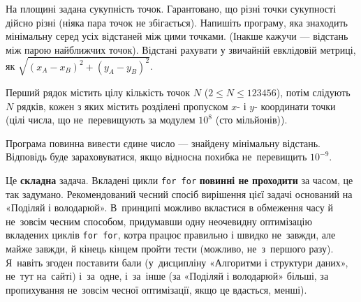 ﻿На площині задана сукупність точок. Гарантовано, що різні точки сукупності дійсно різні (ніяка пара точок не збігається). Напишіть програму, яка знаходить мінімальну серед усіх відстаней між цими точками. (Інакше кажучи --- відстань між парою найближчих точок). Відстані рахувати у звичайній евклідовій метриці, як $\sqrt{(x_A-x_B)^2+(y_A-y_B)^2}$.

\InputFile
Перший рядок містить цілу кількість точок $N$ ($2\leqslant N\leqslant 123456$), потім слідують $N$ рядків, кожен з яких містить розділені пропуском $x$- і $y$- координати точки (цілі числа, що не~перевищують за модулем $10^8$ (сто мільйонів)).

\OutputFile
Програма повинна вивести єдине число --- знайдену мінімальну відстань. Відповідь буде зараховуватися, якщо відносна похибка не~перевищить $10^{-9}$.

\Examples
\begin{example}

    
\end{example}

\Note

Це {\bf складна} задача. Вкладені цикли {\tt for for} {\bf повинні не проходити} за часом, це так задумано. Рекомендований чесний спосіб вирішення цієї задачі оснований на «Поділяй і володарюй». В~принципі можливо вкластися в обмеження часу й не~зовсім чесним способом, придумавши одну неочевидну оптимізацію вкладених циклів {\tt for for}, котра працює правильно і швидко не~завжди, але майже завжди, й кінець кінцем пройти тести (можливо, не~з~першого разу).  Я~навіть згоден поставити бали (у~дисципліну «Алгоритми і структури даних», не~тут на~сайті) і~за~одне, і~за~інше (за «Поділяй і володарюй» більші, за пропихування не~зовсім чесної оптимізації, якщо це вдасться, менші).
